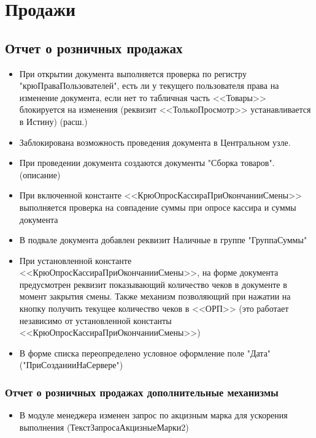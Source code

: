 \section{Продажи}
\subsection{Отчет о розничных продажах}


\begin{itemize}
	\item При открытии документа выполняется проверка по регистру "крюПраваПользователей", есть ли у текущего пользователя права на изменение документа, если нет то табличная часть <<Товары>> блокируется на изменения (реквизит <<ТолькоПросмотр>> устанавливается в Истину) (расш.)
	\item Заблокирована возможность проведения документа в Центральном узле.
	\item При проведении документа создаются документы "Сборка товаров".(описание)
	\item При включенной константе <<КрюОпросКассираПриОкончанииСмены>> выполняется проверка на совпадение суммы при опросе кассира и суммы документа
	\item В подвале документа добавлен реквизит Наличные в группе "ГруппаСуммы"
	\item При установленной константе <<КрюОпросКассираПриОкончанииСмены>>,  на форме документа предусмотрен реквизит показывающий количество чеков в документе в момент закрытия смены. Также механизм позволяющий при нажатии на кнопку  получить текущее количество чеков в <<ОРП>> (это работает независимо от установленной константы <<КрюОпросКассираПриОкончанииСмены>>)
	\item В форме списка переопределено условное оформление поле "Дата" ("ПриСозданииНаСервере")


\end{itemize}

\subsubsection{Отчет о розничных продажах дополнительные механизмы}
\begin{itemize}
	\item В модуле менеджера изменен запрос по акцизным марка для ускорения выполнения (ТекстЗапросаАкцизныеМарки2)
\end{itemize}



